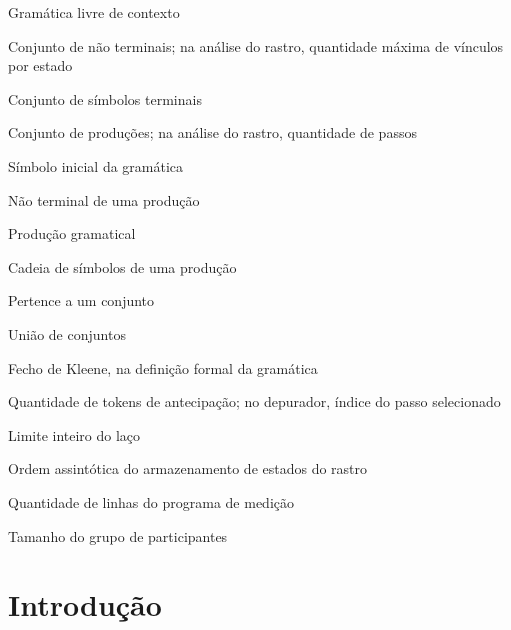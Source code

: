 \documentclass[
    12pt
    ,oneside
    ,a4paper
    ,chapter=TITLE
    ,section=TITLE
    ,sumario=abnt-6027-2012]{abntex2}
\begin{document}
\begin{simbolos}
    \item[$G$] Gramática livre de contexto
    \item[$V$] Conjunto de não terminais; na análise do rastro, quantidade máxima de vínculos por estado
    \item[$\Sigma$] Conjunto de símbolos terminais
    \item[$P$] Conjunto de produções; na análise do rastro, quantidade de passos
    \item[$S$] Símbolo inicial da gramática
    \item[$A$] Não terminal de uma produção
    \item[$\rightarrow$] Produção gramatical
    \item[$\alpha$] Cadeia de símbolos de uma produção
    \item[$\in$] Pertence a um conjunto
    \item[$\cup$] União de conjuntos
    \item[$*$] Fecho de Kleene, na definição formal da gramática
    \item[$k$] Quantidade de tokens de antecipação; no depurador, índice do passo selecionado
    \item[$N$] Limite inteiro do laço
    \item[$\mathcal{O}(PV)$] Ordem assintótica do armazenamento de estados do rastro
    \item[$L$] Quantidade de linhas do programa de medição
    \item[$n$] Tamanho do grupo de participantes
\end{simbolos}

\begingroup
\setrmarg{4em}
\setpnumwidth{2.2em}
\sumario
\endgroup

\textual

\chapter{Introdução}
\label{cap:introducao}
\end{document}

